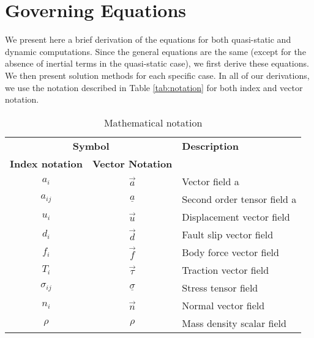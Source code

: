 \chapter{Governing Equations}
\label{cha:governing:equations}

We present here a brief derivation of the equations for both quasi-static
and dynamic computations. Since the general equations are the same
(except for the absence of inertial terms in the quasi-static case),
we first derive these equations. We then present solution methods
for each specific case. In all of our derivations, we use the notation
described in Table \vref{tab:notation} for both index
and vector notation.

\begin{table}[htbp]
  \caption{Mathematical notation}
  \label{tab:notation}
  \begin{tabular}{ccp{3in}}
    \multicolumn{2}{c}{{\bf Symbol}} & {\bf Description} \\
    {\bf Index notation} & {\bf Vector Notation} & \\
    \hline 
    $a_{i}$ & \raisebox{12pt}{}$\overrightarrow{a}$ & Vector field a \\
    $a_{ij}$ & $\underline{a}$ & Second order tensor field a \\
    $u_{i}$ & $\overrightarrow{u}$ & Displacement vector field \\
    $d_{i}$ & $\vec{{d}}$ & Fault slip vector field \\
    $f_{i}$ & $\overrightarrow{f}$ & Body force vector field \\
    $T_{i}$ & $\overrightarrow{\tau}$ & Traction vector field \\
    $\sigma_{ij}$ & $\underline{\sigma}$ & Stress tensor field \\
    $n_{i}$ & $\overrightarrow{n}$ & Normal vector field \\
    $\rho$ & $\rho$ & Mass density scalar field \\
    \hline 
  \end{tabular}
\end{table}







%